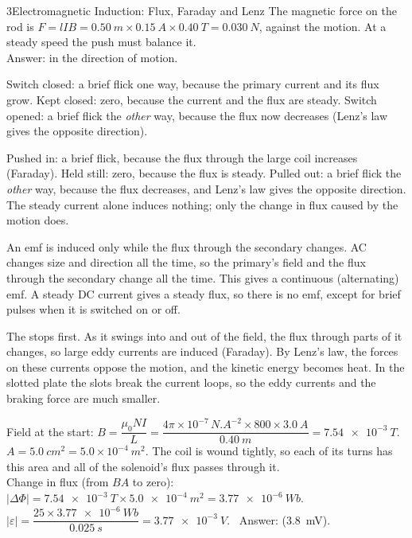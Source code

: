 \begin{chapteranswers}{3}{Electromagnetic Induction: Flux, Faraday and Lenz}
        The magnetic force on the rod is
        $F = lIB = \qty{0.50}{m} \times \qty{0.15}{A} \times \qty{0.40}{T} = \qty{0.030}{N}$,
        against the motion. At a steady speed the push must balance it.\\[4pt]
        Answer:  in the
        direction of motion.
  \item Switch closed: a brief flick one way, because the primary current and its
        flux grow. Kept closed: zero, because the current and the flux are steady.
        Switch opened: a brief flick the \emph{other} way, because the flux now
        decreases (Lenz's law gives the opposite direction).
  \item Pushed in: a brief flick, because the flux through the large coil
        increases (Faraday). Held still: zero, because the flux is steady. Pulled
        out: a brief flick the \emph{other} way, because the flux decreases, and
        Lenz's law gives the opposite direction. The steady current alone
        induces nothing; only the change in flux caused by the motion does.
  \item An emf is induced only while the flux through the secondary changes. AC
        changes size and direction all the time, so the primary's field and the
        flux through the secondary change all the time. This gives a continuous
        (alternating) emf. A steady DC current gives a steady flux, so there is no
        emf, except for brief pulses when it is switched on or off.
  \item The  stops first. As it swings into and out of the field,
        the flux through parts of it changes, so large eddy currents are induced
        (Faraday). By Lenz's law, the forces on these currents oppose the motion,
        and the kinetic energy becomes heat. In the slotted plate the slots break
        the current loops, so the eddy currents and the braking force are much
        smaller.
  \item Field at the start:
        $B = \dfrac{\mu_0 NI}{L} = \dfrac{4\pi\times10^{-7}\,\si{N.A^{-2}} \times 800 \times \qty{3.0}{A}}{\qty{0.40}{m}}
        = \qty{7.54e-3}{T}$.\\[4pt]
        $A = \qty{5.0}{cm^2} = 5.0 \times 10^{-4}\ \si{m^2}$. The coil is wound
        tightly, so each of its turns has this area and all of the solenoid's flux
        passes through it.\\[4pt]
        Change in flux (from $BA$ to zero):
        $\lvert\Delta\Phi\rvert = \qty{7.54e-3}{T} \times \qty{5.0e-4}{m^2} = \qty{3.77e-6}{Wb}$.\\[4pt]
        $\lvert\varepsilon\rvert = \dfrac{25 \times \qty{3.77e-6}{Wb}}{\qty{0.025}{s}}
        = \qty{3.77e-3}{V}$. \ Answer:  (\qty{3.8}{mV}).
\end{chapteranswers}
